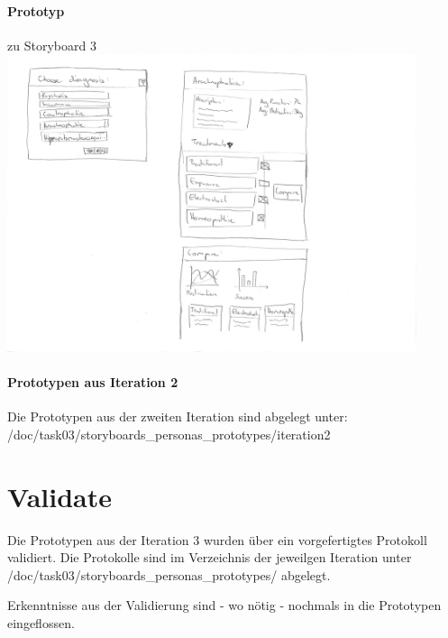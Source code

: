 \documentclass[a4paper]{scrreprt}
\begin{document}
\pagebreak
\paragraph{Prototyp } zu Storyboard 3\\

\includegraphics[width=0.9\textwidth]{storyboards_personas_prototypes/iteration3/eller1_storyboard2_prototype.png}

\bigskip

\paragraph{Prototypen aus Iteration 2}
Die Prototypen aus der zweiten Iteration sind abgelegt unter:
/doc/task03/storyboards\_personas\_prototypes/iteration2

\section{Validate}
Die Prototypen aus der Iteration 3 wurden über ein vorgefertigtes Protokoll validiert. Die Protokolle sind im Verzeichnis der jeweilgen Iteration unter /doc/task03/storyboards\_personas\_prototypes/ abgelegt.

Erkenntnisse aus der Validierung sind - wo nötig - nochmals in die Prototypen eingeflossen.
\end{document}

